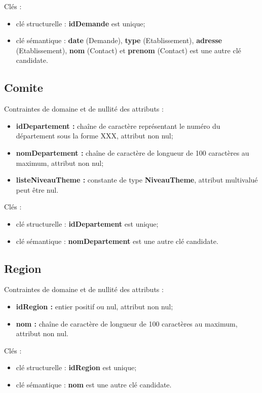\documentclass[asi, sansVersion]{picInsa}
\begin{document}
Clés : 
\begin{itemize}
\item clé structurelle : \textbf{idDemande} est unique;
\item clé sémantique : \textbf{date} (Demande), \textbf{type} (Etablissement), \textbf{adresse} (Etablissement), \textbf{nom} (Contact) et \textbf{prenom} (Contact) est une autre clé candidate. \\ 
\end{itemize}

\subsection*{Comite}
Contraintes de domaine et de nullité des attributs :
\begin{itemize}
	\item \textbf{idDepartement :} chaîne de caractère représentant le numéro du département sous la forme XXX, attribut non nul;
	\item \textbf{nomDepartement :} chaîne de caractère de longueur de 100 caractères au maximum, attribut non nul;
	\item \textbf{listeNiveauTheme :} constante de type \textbf{NiveauTheme}, attribut multivalué peut être nul. \\
\end{itemize}

Clés : 
\begin{itemize}
\item clé structurelle : \textbf{idDepartement} est unique;
\item clé sémantique : \textbf{nomDepartement} est une autre clé candidate. \\ 
\end{itemize}

\subsection*{Region}
Contraintes de domaine et de nullité des attributs :
\begin{itemize}
	\item \textbf{idRegion :} entier positif ou nul, attribut non nul;
	\item \textbf{nom :} chaîne de caractère de longueur de 100 caractères au maximum, attribut non nul.\\
\end{itemize}

Clés : 
\begin{itemize}
\item clé structurelle : \textbf{idRegion} est unique;
\item clé sémantique : \textbf{nom} est une autre clé candidate. \\ 
\end{itemize}
\end{document}
